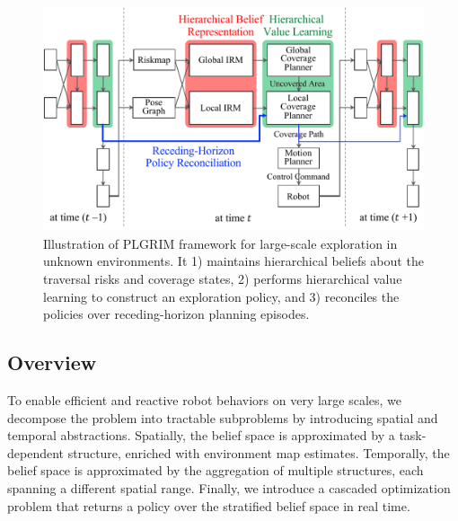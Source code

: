 \documentclass[letterpaper]{article} %
\newcommand{\phdone}[1]{} %
\begin{document}
% 	    	
%

\begin{figure}[t!]
  \centering
  \includegraphics[width=\columnwidth]{figures/diagram.pdf}
  \caption{Illustration of PLGRIM framework for large-scale exploration in unknown environments.
  It 1) maintains hierarchical beliefs about the traversal risks and coverage states,
  2) performs hierarchical value learning to construct an exploration policy, and 
  3) reconciles the policies over receding-horizon planning episodes.} \label{fig:framework} 
\end{figure}




\subsection{Overview}
To enable efficient and reactive robot behaviors on very large scales, we decompose the problem into tractable subproblems by introducing spatial and temporal abstractions. Spatially, the belief space is approximated by a task-dependent structure, enriched with environment map estimates. Temporally, the belief space is approximated by the aggregation of multiple structures, each spanning a different spatial range. Finally, we introduce a cascaded optimization problem that returns a policy over the stratified belief space in real time. 
\end{document}
